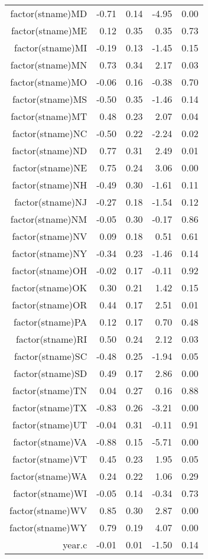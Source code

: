 \begin{table}[ht]
\begin{tabular}{rrrrr}
  factor(stname)MD & -0.71 & 0.14 & -4.95 & 0.00 \\ 
  factor(stname)ME & 0.12 & 0.35 & 0.35 & 0.73 \\ 
  factor(stname)MI & -0.19 & 0.13 & -1.45 & 0.15 \\ 
  factor(stname)MN & 0.73 & 0.34 & 2.17 & 0.03 \\ 
  factor(stname)MO & -0.06 & 0.16 & -0.38 & 0.70 \\ 
  factor(stname)MS & -0.50 & 0.35 & -1.46 & 0.14 \\ 
  factor(stname)MT & 0.48 & 0.23 & 2.07 & 0.04 \\ 
  factor(stname)NC & -0.50 & 0.22 & -2.24 & 0.02 \\ 
  factor(stname)ND & 0.77 & 0.31 & 2.49 & 0.01 \\ 
  factor(stname)NE & 0.75 & 0.24 & 3.06 & 0.00 \\ 
  factor(stname)NH & -0.49 & 0.30 & -1.61 & 0.11 \\ 
  factor(stname)NJ & -0.27 & 0.18 & -1.54 & 0.12 \\ 
  factor(stname)NM & -0.05 & 0.30 & -0.17 & 0.86 \\ 
  factor(stname)NV & 0.09 & 0.18 & 0.51 & 0.61 \\ 
  factor(stname)NY & -0.34 & 0.23 & -1.46 & 0.14 \\ 
  factor(stname)OH & -0.02 & 0.17 & -0.11 & 0.92 \\ 
  factor(stname)OK & 0.30 & 0.21 & 1.42 & 0.15 \\ 
  factor(stname)OR & 0.44 & 0.17 & 2.51 & 0.01 \\ 
  factor(stname)PA & 0.12 & 0.17 & 0.70 & 0.48 \\ 
  factor(stname)RI & 0.50 & 0.24 & 2.12 & 0.03 \\ 
  factor(stname)SC & -0.48 & 0.25 & -1.94 & 0.05 \\ 
  factor(stname)SD & 0.49 & 0.17 & 2.86 & 0.00 \\ 
  factor(stname)TN & 0.04 & 0.27 & 0.16 & 0.88 \\ 
  factor(stname)TX & -0.83 & 0.26 & -3.21 & 0.00 \\ 
  factor(stname)UT & -0.04 & 0.31 & -0.11 & 0.91 \\ 
  factor(stname)VA & -0.88 & 0.15 & -5.71 & 0.00 \\ 
  factor(stname)VT & 0.45 & 0.23 & 1.95 & 0.05 \\ 
  factor(stname)WA & 0.24 & 0.22 & 1.06 & 0.29 \\ 
  factor(stname)WI & -0.05 & 0.14 & -0.34 & 0.73 \\ 
  factor(stname)WV & 0.85 & 0.30 & 2.87 & 0.00 \\ 
  factor(stname)WY & 0.79 & 0.19 & 4.07 & 0.00 \\ 
  year.c & -0.01 & 0.01 & -1.50 & 0.14 \\ 
   \hline
\end{tabular}
\end{table}
